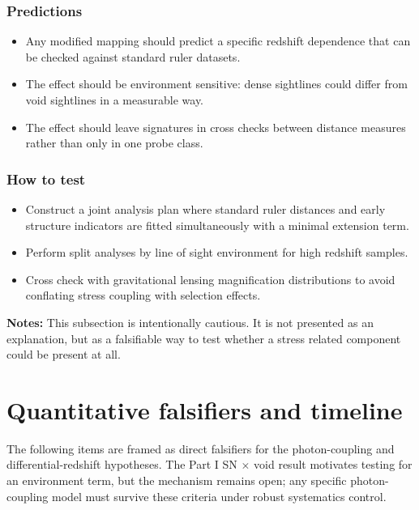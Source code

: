 \documentclass[11pt,a4paper]{article}
\begin{document}
\subsubsection{Predictions}
\begin{itemize}
  \item Any modified mapping should predict a specific redshift dependence that can be checked against standard ruler datasets.
  \item The effect should be environment sensitive: dense sightlines could differ from void sightlines in a measurable way.
  \item The effect should leave signatures in cross checks between distance measures rather than only in one probe class.
\end{itemize}

\subsubsection{How to test}
\begin{itemize}
  \item Construct a joint analysis plan where standard ruler distances and early structure indicators are fitted simultaneously with a minimal extension term.
  \item Perform split analyses by line of sight environment for high redshift samples.
  \item Cross check with gravitational lensing magnification distributions to avoid conflating stress coupling with selection effects.
\end{itemize}

\begin{mdframed}[linecolor=accent,linewidth=0.5pt,backgroundcolor=callout-bg,leftline=true,rightline=true,topline=true,bottomline=true,innerleftmargin=8pt,innerrightmargin=8pt,innertopmargin=6pt,innerbottommargin=6pt]
\textbf{Notes:} This subsection is intentionally cautious. It is not presented as an explanation, but as a falsifiable way to test whether a stress related component could be present at all.
\end{mdframed}

\section{Quantitative falsifiers and timeline}
\label{sec:tests}
The following items are framed as direct falsifiers for the photon-coupling and differential-redshift hypotheses. The Part I SN $\times$ void result motivates testing for an environment term, but the mechanism remains open; any specific photon-coupling model must survive these criteria under robust systematics control.
\end{document}
